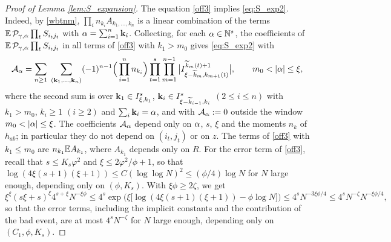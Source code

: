 \begin{proof}[Proof of Lemma \ref{lem:S_expansion}]
The equation \eqref{off3} implies \eqref{eq:S_exp2}. Indeed, by \eqref{wbtnm}, $\prod_i n_{k_i}A_{k_1,\dots,k_n}$ is a linear combination of the terms $\mathbb{E}\,\mathcal P_{\gamma,\alpha}\prod_t S_{i_tj_t}$ with $\alpha=\sum_{i=1}^n{\bf k}_i$. Collecting, for each $\alpha\in\mathbb N^s$, the coefficients of $\mathbb{E}\,\mathcal P_{\gamma,\alpha}\prod_t S_{i_tj_t}$ in all terms of \eqref{off3} with $k_1>m_0$ gives \eqref{eq:S_exp2} with
$$
\mathcal A_\al=\sum_{n\ge1}\;\sum_{({\bf k}_1,\dots,{\bf k}_n)}(-1)^{n-1}\Big(\prod_{i=1}^n n_{k_i}\Big)\prod_{t=1}^s\prod_{m=1}^{n-1}\big|I^{\wt k_m(t)+1}_{\xi-\wt k_m,k_{m+1}(t)}\big|, \qquad m_0<|\al|\le\xi,
$$
where the second sum is over ${\bf k}_1\in I^s_{\xi,k_1}$, ${\bf k}_{i}\in I^s_{\xi-\widetilde k_{i-1},k_i}$ $(2\le i\le n)$ with $k_1>m_0$, $k_i\ge1$ $(i\ge2)$ and $\sum_i{\bf k}_i=\alpha$, and with $\mathcal A_\alpha:=0$ outside the window $m_0<|\al|\le\xi$. The coefficients $\mathcal A_\alpha$ depend only on $\alpha$, $s$, $\xi$ and the moments $n_k$ of $h_{ab}$; in particular they do not depend on $(i_t,j_t)$ or on $z$. The terms of \eqref{off3} with $k_1\le m_0$ are $n_{k_1}\mathbb{E} A_{k_1}$, where $A_{k_1}$ depends only on $R$. For the error term of \eqref{off3}, recall that $s\le K_s\varphi^2$ and $\xi\le2\varphi^2/\phi+1$, so that $\log(4\xi(s+1)(\xi+1))\le C(\log\log N)^2\le(\phi/4)\log N$ for $N$ large enough, depending only on $(\phi,K_s)$. With $\xi\phi\ge2\zeta$, we get
$$
\xi ^\xi ( s\xi+s)^{\xi} 4^{s+\xi}   N^{-\xi\phi }\le 4^s\exp\Big(\xi\big[\log(4\xi(s+1)(\xi+1))-\phi\log N\big]\Big)\le 4^s N^{-3\xi\phi/4}\le 4^sN^{-\zeta}N^{-\xi\phi/4},
$$
so that the error terms, including the implicit constants and the contribution of the bad event, are at most $4^sN^{-\zeta}$ for $N$ large enough, depending only on $(C_1,\phi,K_s)$.


\end{proof}
